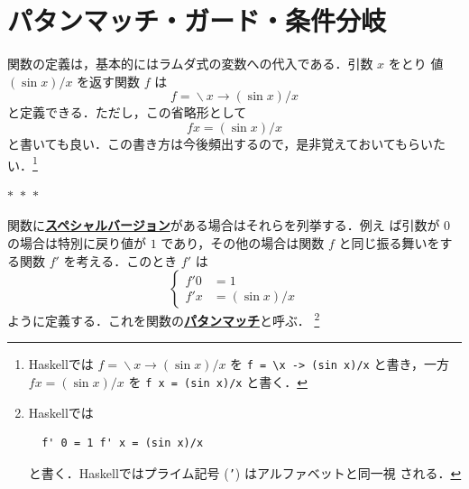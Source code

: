\documentclass[a5paper,twoside,fleqn]{jsbook}
\newcommand{\separator}{\begin{center}$*$~$*$~$*$\end{center}}
\newcommand{\programminglanguage}[1]{\textsf{#1}}
\newcommand{\haskell}{\programminglanguage{Haskell}}
\newcommand{\python}{\programminglanguage{Python}}
\newcommand{\keyword}[1]{{\underline{\textbf{#1}}}}
\newcommand{\code}[1]{\texttt{#1}}
\newenvironment{pythoncode}{\begin{itembox}[r]{\python}}{\end{itembox}}
\DeclareMathOperator{\mLambda}{\backslash}
\DeclareMathOperator{\mLambdaArrow}{\rightarrow}
\newcommand{\mLambdaExp}[2]{\mLambda{#1}\mLambdaArrow{#2}}
\begin{document}
\section{パタンマッチ・ガード・条件分岐}

関数の定義は，基本的にはラムダ式の変数への代入である．引数 $x$ をとり
値 $(\sin x)/x$ を返す関数 $f$ は
\begin{equation}
f=\mLambdaExp{x}{(\sin x)/x}
\end{equation}
と定義できる．ただし，この省略形として
\begin{equation}
fx=(\sin x)/x
\end{equation}
と書いても良い．この書き方は今後頻出するので，是非覚えておいてもらいた
い．\footnote{\haskell では $f=\mLambdaExp{x}{(\sin x)/x}$ を \code{f
    = \textbackslash x -> (sin x)/x} と書き，一方 $fx=(\sin x)/x$ を
  \code{f x = (sin x)/x} と書く．}


\separator

関数に\keyword{スペシャルバージョン}がある場合はそれらを列挙する．例え
ば引数が $0$ の場合は特別に戻り値が $1$ であり，その他の場合は関数 $f$
と同じ振る舞いをする関数 $f'$ を考える．このとき $f'$ は
\begin{equation}
\left\{
\begin{aligned}
f'0&=1\\ f'x&=(\sin x)/x
\end{aligned}
\right.
\end{equation}
ように定義する．これを関数の\keyword{パタンマッチ}と呼ぶ．
\footnote{\haskell では
\begin{verbatim}
  f' 0 = 1 f' x = (sin x)/x
\end{verbatim}
と書く．\haskell ではプライム記号 (\code{'}) はアルファベットと同一視
される．}
\end{document}
